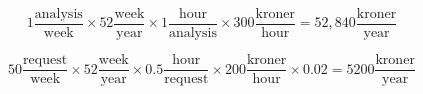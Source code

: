 \documentclass[pdftext, 11pt, a4paper]{report}
\begin{document}
\[ 1 \frac{\mathrm{analysis}}{\mathrm{week}} \times 52 \frac{\mathrm{week}}{\mathrm{year}} \times 1 \frac{\mathrm{hour}}{\mathrm{analysis}} \times 300 \frac{\mathrm{kroner}}{\mathrm{hour}} = 52,840 \frac{\mathrm{kroner}}{\mathrm{year}}\]

\[ 50 \frac{\mathrm{request}}{\mathrm{week}} \times 52 \frac{\mathrm{week}}{\mathrm{year}} \times 0.5 \frac{\mathrm{hour}}{\mathrm{request}} \times 200 \frac{\mathrm{kroner}}{\mathrm{hour}} \times 0.02 = 5200 \frac{\mathrm{kroner}}{\mathrm{year}} \]


%



\begin{appendices}









\end{appendices}


\end{document}
